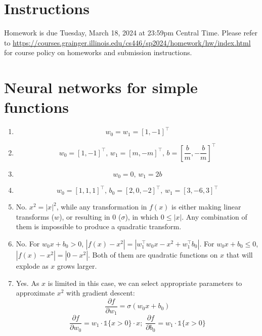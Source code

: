 \documentclass[12pt]{article}
\begin{document}
\singlespacing

\renewcommand{\familydefault}{\rmdefault}


\section{Instructions}

Homework is due Tuesday, March 18, 2024 at 23:59pm Central Time.
Please refer to \url{https://courses.grainger.illinois.edu/cs446/sp2024/homework/hw/index.html} for course policy on homeworks and submission instructions.

\section{Neural networks for simple functions}
\begin{enumerate}
    \item   \[w_0 = w_1 = [1, -1]^{\top}\]
    \item   \[w_0 = [1, -1]^{\top}, \, w_1 = [m, -m]^{\top}, \, b = [\frac{b}{m}, -\frac{b}{m}]^{\top}\]
    \item   \[w_0 = 0, \, w_1 = 2b\]
    \item   \[w_0 = [1, 1, 1]^{\top}, \, b_0 = [2, 0,-2]^{\top}, \, w_1 = [3, -6, 3]^{\top}\]
    \item   No. $x^2 = |x|^2$, while any transformation in $f(x)$ is either making linear transforms ($w$), or resulting in 0 ($\sigma$), in which $0 \leq |x|$. Any combination of them is impossible to produce a quadratic transform.
    \item   No. For $w_0x + b_0 > 0$, $|f(x) - x^2| = |w_1^{\top}w_0x - x^2 + w_1^{\top}b_0|$. For $w_0x + b_0 \leq 0$, $|f(x) - x^2| = |0 - x^2|$. Both of them are quadratic functions on $x$ that will explode as $x$ grows larger.
    \item   Yes. As $x$ is limited in this case, we can select appropriate parameters to approximate $x^2$ with gradient descent:
    \[\frac{\partial f}{\partial w_1} = \sigma(w_0x + b_0)\]
    \[\frac{\partial f}{\partial w_0} = w_1\cdot\mathds{1}\{x>0\}\cdot x;\; \frac{\partial f}{\partial b_0} = w_1\cdot\mathds{1}\{x>0\}\]
\end{enumerate}
\newpage
\end{document}
